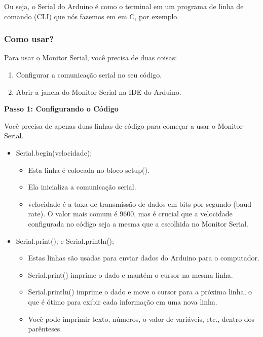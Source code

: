 \documentclass{report}
\begin{document}
	Ou seja, o Serial do Arduino é como o terminal em um programa de linha de comando (CLI) que nós fazemos em em C, por exemplo.
	
	
	\subsubsection{Como usar?}
	Para usar o Monitor Serial, você precisa de duas coisas:
	
	\begin{enumerate}
		\item Configurar a comunicação serial no seu código.
		\item Abrir a janela do Monitor Serial na IDE do Arduino.
	\end{enumerate}
	
	\begin{large}
		\textbf{Passo 1: Configurando o Código}
		\\
	\end{large}
	
	Você precisa de apenas duas linhas de código para começar a usar o Monitor Serial.
	
	\begin{itemize}
		\item Serial.begin(velocidade);
		\begin{itemize}
			\item Esta linha é colocada no bloco setup().
			\item Ela inicializa a comunicação serial.
			\item velocidade é a taxa de transmissão de dados em bits por segundo (baud rate). O valor mais comum é 9600, mas é crucial que a velocidade configurada no código seja a mesma que a escolhida no Monitor Serial.
		\end{itemize}
		\item Serial.print(); e Serial.println();
		
		\begin{itemize}
			\item Estas linhas são usadas para enviar dados do Arduino para o computador.
			\item Serial.print() imprime o dado e mantém o cursor na mesma linha.
			\item Serial.println() imprime o dado e move o cursor para a próxima linha, o que é ótimo para exibir cada informação em uma nova linha.
			\item Você pode imprimir texto, números, o valor de variáveis, etc., dentro dos parênteses.
			
		\end{itemize}
	\end{itemize}
	
\end{document}
